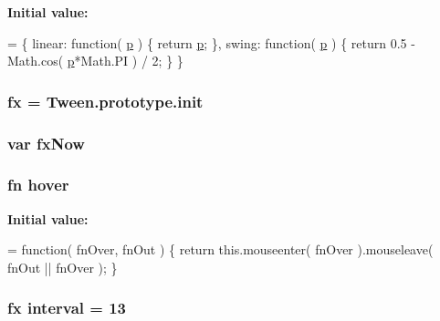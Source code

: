 {\bfseries Initial value\+:}
\begin{DoxyCode}
= \{
    linear: \textcolor{keyword}{function}( \hyperlink{media_2js_2jquery_8js_a32d2366ed9853870f0c2ef3553996e29}{p} ) \{
        \textcolor{keywordflow}{return} \hyperlink{media_2js_2jquery_8js_a32d2366ed9853870f0c2ef3553996e29}{p};
    \},
    swing: \textcolor{keyword}{function}( \hyperlink{media_2js_2jquery_8js_a32d2366ed9853870f0c2ef3553996e29}{p} ) \{
        \textcolor{keywordflow}{return} 0.5 - Math.cos( \hyperlink{media_2js_2jquery_8js_a32d2366ed9853870f0c2ef3553996e29}{p}*Math.PI ) / 2;
    \}
\}
\end{DoxyCode}
\hypertarget{jquery-1_89_81_8js_afbcf56cb9545c8bc885722b4fe4253ce}{
\subsubsection[{fx}]{ fx = {\bf Tween.\+prototype.\+init}}}\label{jquery-1_89_81_8js_afbcf56cb9545c8bc885722b4fe4253ce}
\hypertarget{jquery-1_89_81_8js_a008b3271e2f410e89917bc6d96096296}{
\subsubsection[{fx\+Now}]{\setlength{\rightskip}{0pt plus 5cm}var fx\+Now}}\label{jquery-1_89_81_8js_a008b3271e2f410e89917bc6d96096296}
\hypertarget{jquery-1_89_81_8js_a8bc5a390911533398a1fc5db0a599858}{
\subsubsection[{hover}]{ {\bf fn} hover}}\label{jquery-1_89_81_8js_a8bc5a390911533398a1fc5db0a599858}
{\bfseries Initial value\+:}
\begin{DoxyCode}
= \textcolor{keyword}{function}( fnOver, fnOut ) \{
    \textcolor{keywordflow}{return} this.mouseenter( fnOver ).mouseleave( fnOut || fnOver );
\}
\end{DoxyCode}
\hypertarget{jquery-1_89_81_8js_a22f2d1dcf51c862e922248df75aaa9f7}{
\subsubsection[{interval}]{ {\bf fx} interval = 13}}\label{jquery-1_89_81_8js_a22f2d1dcf51c862e922248df75aaa9f7}
